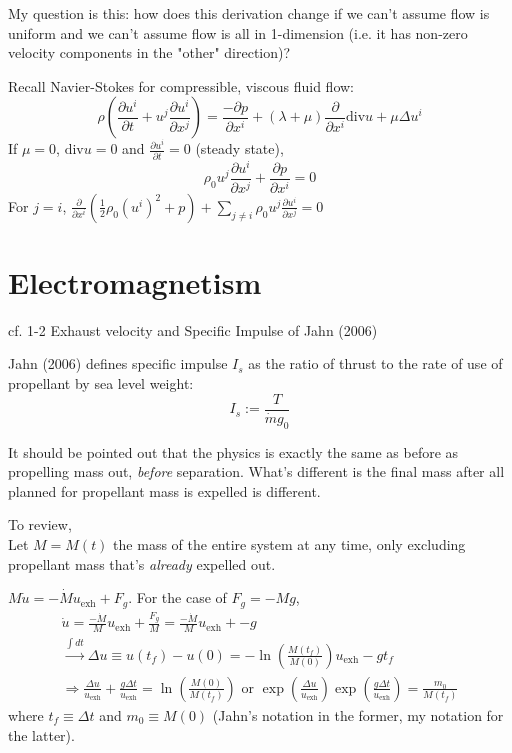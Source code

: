 \documentclass[10pt]{amsart}
\newcommand{\problemhead}[1]
  {
   \noindent{\small\bf Problem #1.}
   }
\begin{document}
\begin{multicols*}{2}
My question is this: how does this derivation change if we can't assume flow is uniform and we can't assume flow is all in 1-dimension (i.e. it has non-zero velocity components in the "other" direction)?

Recall Navier-Stokes for compressible, viscous fluid flow:
\[
\rho \left( \frac{ \partial u^i }{ \partial t} + u^j \frac{\partial u^i }{ \partial x^j} \right) = \frac{- \partial p }{ \partial x^i } + ( \lambda +\mu) \frac{\partial }{ \partial x^i } \text{div}u + \mu \Delta u^i
\]
If $\mu =0$, $\text{div}u = 0$ and $\frac{\partial u^i}{\partial t} = 0$ (steady state),
\[
\rho_0 u^j \frac{\partial u^i}{\partial x^j} + \frac{ \partial p}{\partial x^i} = 0
\]
For $j=i$, $\frac{\partial }{ \partial x^i} (\frac{1}{2} \rho_0 (u^i)^2 + p) + \sum_{j\neq i} \rho_0 u^j \frac{\partial u^i}{\partial x^j } = 0$


\part{Electromagnetism}


cf. 1-2 Exhaust velocity and Specific Impulse of Jahn (2006) \cite{Jahn2006}

Jahn (2006) \cite{Jahn2006} defines specific impulse $I_s$ as the ratio of thrust to the rate of use of propellant by sea level weight:
\begin{equation}
  I_s := \frac{ T}{ \dot{m}g_0}
\end{equation}

\problemhead{1-4} It should be pointed out that the physics is exactly the same as before as propelling mass out, \emph{before} separation.  What's different is the final mass after all planned for propellant mass is expelled is different.

To review,  \\

Let $M=M(t)$ the mass of the entire system at any time, only excluding propellant mass that's \emph{already} expelled out.  

$M\dot{u} = -\dot{M}u_{\text{exh}} + F_g$.  For the case of $F_g = -Mg$,
\[
\begin{gathered}
  \dot{u} = \frac{-\dot{M}}{M} u_{\text{exh}} + \frac{F_g}{M} = \frac{-\dot{M}}{M} u_{\text{exh}} + -g \\
  \xrightarrow{ \int dt } \Delta u \equiv u(t_f) - u(0) = -\ln{ \left( \frac{M(t_f)}{M(0)} \right)}u_{\text{exh}} - gt_f \\
  \Longrightarrow \frac{\Delta u}{ u_{\text{exh}}} + \frac{ g\Delta t }{ u_{\text{exh}} } = \ln{ \left( \frac{M(0) }{ M(t_f)} \right)} \text{ or } \exp{ \left( \frac{ \Delta u}{ u_{\text{exh}} } \right) } \exp{ \left( \frac{ g \Delta t}{ u_{\text{exh}} } \right) } = \frac{ m_0 }{ M(t_f) }
\end{gathered}
\]
where $t_f \equiv \Delta t$ and $m_0 \equiv M(0)$ (Jahn's notation in the former, my notation for the latter).   


\end{multicols*}
\end{document}
